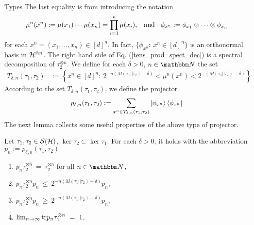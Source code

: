 \begin{subsection}{Types}
The last equality is from introducing the notation
\begin{align*}
 \mu^n(x^n) : = \mu(x_1) \cdots \mu(x_n) = \prod_{i=1}^n \mu(x_i), \hspace{.3cm} \text{and} \hspace{.3cm} \phi_{x^n} := \phi_{x_1} \otimes \cdots \otimes \phi_{x_n}
\end{align*}
for each $x^n = (x_1, \dots, x_n) \in [d]^n$. In fact, $\{\phi_{x^n}: \ x^n \in [d]^n\}$ is an orthonormal basis in ${\mathcal H}^{\otimes n}$. 
The right hand side of Eq. (\ref{tens_prod_spect_dec}) is a spectral decomposition of $\tau_2^{\otimes n}$. We define for each $\delta > 0$, $n \in \bbmN$ the set
\begin{align}
 T_{\delta,n}(\tau_1, \tau_2) 
  &:= \left\{x^n \in [d]^n: \ 2^{-n(M(\tau_1||\tau_2) + \delta)} <  \mu^n(x^n) <  2^{-(M(\tau_1||\tau_2) - \delta)} \right\} \label{def:rel_typical_set}
 \end{align}
According to the set $T_{\delta,n}(\tau_1,\tau_2)$, we define the projector
\begin{align*}
 p_{\delta, n}(\tau_1,\tau_2) := \sum_{x^n \in T_{\delta,n}(\tau_1,\tau_2)} \ket{\phi_{x^n}} \bra{\phi_{x^n}}
\end{align*}
The next lemma collects some useful properties of the above type of projector. 
\begin{lemma}\label{lemma:steins_lemma_projection}
 Let $\tau_1, \tau_2 \in {\mathcal S}({\mathcal H})$, $\ker \tau_2 \subset \ker{\tau_1}$. For each $\delta > 0$, it holds with the abbreviation $p_n := p_{\delta,n}(\tau_1,\tau_2)$ 
 \begin{enumerate}
  \item $p_n \tau_2^{\otimes n} \ = \ \tau_2^{\otimes n}$ for all $n \in \bbmN$, \label{lemma:steins_lemma_projection_1}
  \item $p_n \tau_2^{\otimes n} p_n \ \leq \ 2^{-n(M(\tau_1||\tau_2)- \delta)} p_n$, \label{lemma:steins_lemma_projection_2}
  \item $p_n \tau_2^{\otimes n} p_n \ \geq \ 2^{-n(M(\tau_1||\tau_2)+ \delta)} p_n$, \label{lemma:steins_lemma_projection_3}
  \item $\lim_{n \rightarrow \infty} \mathrm{tr} p_n \tau_1^{\otimes n} \ = \ 1$. \label{lemma:steins_lemma_projection_4}
 \end{enumerate}
 \end{lemma}


\end{subsection}
